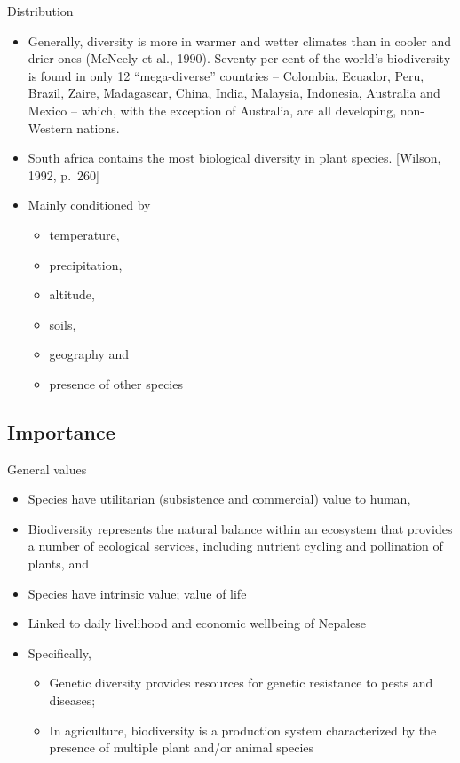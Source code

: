 \documentclass[
  ignorenonframetext,
  aspectratio=169]{beamer}
\providecommand{\tightlist}{%
  \setlength{\itemsep}{0pt}\setlength{\parskip}{0pt}}
\begin{document}
\begin{frame}{Distribution}
\protect\hypertarget{distribution}{}
\begin{itemize}
\item
  Generally, diversity is more in warmer and wetter climates than in
  cooler and drier ones (McNeely et al., 1990). Seventy per cent of the
  world's biodiversity is found in only 12 ``mega-diverse'' countries --
  Colombia, Ecuador, Peru, Brazil, Zaire, Madagascar, China, India,
  Malaysia, Indonesia, Australia and Mexico -- which, with the exception
  of Australia, are all developing, non-Western nations.
\item
  South africa contains the most biological diversity in plant species.
  {[}Wilson, 1992, p.~260{]}
\item
  Mainly conditioned by

  \begin{itemize}
  \tightlist
  \item
    temperature,
  \item
    precipitation,
  \item
    altitude,
  \item
    soils,
  \item
    geography and
  \item
    presence of other species
  \end{itemize}
\end{itemize}
\end{frame}

\hypertarget{importance}{%
\subsection{Importance}\label{importance}}

\begin{frame}{General values}
\protect\hypertarget{general-values}{}
\begin{itemize}
\tightlist
\item
  Species have utilitarian (subsistence and commercial) value to human,
\item
  Biodiversity represents the natural balance within an ecosystem that
  provides a number of ecological services, including nutrient cycling
  and pollination of plants, and
\item
  Species have intrinsic value; value of life
\item
  Linked to daily livelihood and economic wellbeing of Nepalese
\item
  Specifically,

  \begin{itemize}
  \tightlist
  \item
    Genetic diversity provides resources for genetic resistance to pests
    and diseases;
  \item
    In agriculture, biodiversity is a production system characterized by
    the presence of multiple plant and/or animal species
  \end{itemize}
\end{itemize}
\end{frame}
\end{document}
